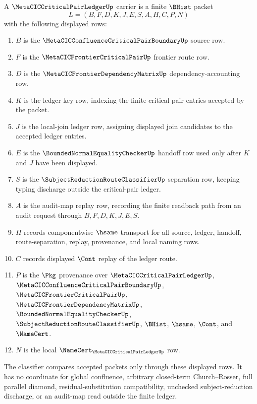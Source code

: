 \begin{definition}
\label{def:metacic-critical-pair-ledger-carrier}
A $\MetaCICCriticalPairLedgerUp$ carrier is a finite $\BHist$ packet
$$
L=(B,F,D,K,J,E,S,A,H,C,P,N)
$$
with the following displayed rows:
\begin{enumerate}
\item $B$ is the $\MetaCICConfluenceCriticalPairBoundaryUp$ source row.
\item $F$ is the $\MetaCICFrontierCriticalPairUp$ frontier route row.
\item $D$ is the $\MetaCICFrontierDependencyMatrixUp$ dependency-accounting row.
\item $K$ is the ledger key row, indexing the finite critical-pair entries accepted by the packet.
\item $J$ is the local-join ledger row, assigning displayed join candidates to the accepted ledger entries.
\item $E$ is the $\BoundedNormalEqualityCheckerUp$ handoff row used only after $K$ and $J$ have been displayed.
\item $S$ is the $\SubjectReductionRouteClassifierUp$ separation row, keeping typing discharge outside the critical-pair ledger.
\item $A$ is the audit-map replay row, recording the finite readback path from an audit request through $B,F,D,K,J,E,S$.
\item $H$ records componentwise $\hsame$ transport for all source, ledger, handoff, route-separation, replay, provenance, and local naming rows.
\item $C$ records displayed $\Cont$ replay of the ledger route.
\item $P$ is the $\Pkg$ provenance over $\MetaCICCriticalPairLedgerUp$, $\MetaCICConfluenceCriticalPairBoundaryUp$, $\MetaCICFrontierCriticalPairUp$, $\MetaCICFrontierDependencyMatrixUp$, $\BoundedNormalEqualityCheckerUp$, $\SubjectReductionRouteClassifierUp$, $\BHist$, $\hsame$, $\Cont$, and $\NameCert$.
\item $N$ is the local $\NameCert_{\MetaCICCriticalPairLedgerUp}$ row.
\end{enumerate}
The classifier compares accepted packets only through these displayed rows. It has no coordinate for global confluence, arbitrary closed-term Church--Rosser, full parallel diamond, residual-substitution compatibility, unchecked subject-reduction discharge, or an audit-map read outside the finite ledger.
\end{definition}

